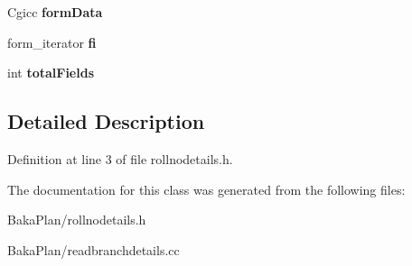 \begin{DoxyCompactItemize}
\item 
\hypertarget{classReadBranchDetails_a7bb99a6ec821f098371df4cb65ab8f65}{Cgicc {\bfseries form\-Data}}\label{classReadBranchDetails_a7bb99a6ec821f098371df4cb65ab8f65}

\item 
\hypertarget{classReadBranchDetails_a6ffffa42ad379f516a3419496469a0d6}{form\-\_\-iterator {\bfseries fi}}\label{classReadBranchDetails_a6ffffa42ad379f516a3419496469a0d6}

\item 
\hypertarget{classReadBranchDetails_afc1d050b96d76aa1e3a8f31a39f7658b}{int {\bfseries total\-Fields}}\label{classReadBranchDetails_afc1d050b96d76aa1e3a8f31a39f7658b}

\end{DoxyCompactItemize}


\subsection{Detailed Description}


Definition at line 3 of file rollnodetails.\-h.



The documentation for this class was generated from the following files\-:\begin{DoxyCompactItemize}
\item 
Baka\-Plan/rollnodetails.\-h\item 
Baka\-Plan/readbranchdetails.\-cc\end{DoxyCompactItemize}
